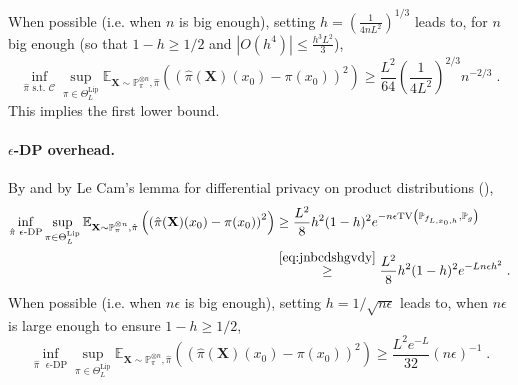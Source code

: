 \documentclass[10pt]{article} %
\newcommand{\Prob}[0]{\mathbb{P}}
\newcommand{\E}[0]{\mathbb{E}}
\newcommand\vect[1]{\mathbf{#1}}
\newcommand\tv[2]{\mathrm{TV}\left( {#1}, {#2} \right)}
\newcommand\p[1]{\left( {#1}\right)}
\begin{document}
When possible (i.e. when $n$ is big enough), setting $h = \p{\frac{1}{4nL^2}}^{1/3}$ leads to, for $n$ big enough (so that $1-h \geq 1/2$ %
and $|O(h^4)| \leq \frac{h^3L^2}{3}$),
\begin{equation*}
    \inf_{\hat{\pi} \text{ s.t. } \mathcal{C}} \sup_{\pi \in \Theta^{\text{Lip}}_L}
    \E_{\vect{X} \sim \Prob_{\pi}^{\otimes n}, \hat{\pi}}\p{\p{\hat{\pi}(\vect{X})(x_0) - \pi(x_0)}^2} \geq \frac{L^2}{64} \p{\frac{1}{4L^2}}^{2/3} n^{-2/3}
    \;.
\end{equation*}
This implies the first lower bound. 

\paragraph{$\epsilon$-DP overhead.}
By  and by Le Cam's lemma for differential privacy on product distributions (),
\begin{equation*}
    \begin{aligned}
    \inf_{\hat{\pi} \text{ $\epsilon$-DP}} \sup_{\pi \in \Theta^{\text{Lip}}_L}
    \E_{\vect{X} \sim \Prob_{\pi}^{\otimes n}, \hat{\pi}}\p{\p{\hat{\pi}(\vect{X})(x_0) - \pi(x_0)}^2} 
    &\geq 
    \frac{L^2}{8}h^2 (1-h)^2
    e^{-n\epsilon \tv{\Prob_{f_{L, x_0, h}}}{\Prob_{g}} } \\
    &\stackrel{\eqref{eq:jnbcdshgvdy}}{\geq} 
    \frac{L^2}{8} h^2 (1-h)^2 %
    e^{-L n \epsilon h^2}\;.
    \end{aligned}
\end{equation*}
When possible (i.e. when $n \epsilon$ is big enough), setting $h = 1/\sqrt{n\epsilon}$ leads to, when $n \epsilon$ is large enough to ensure $1-h \geq 1/2$,  %
\begin{equation*}
    \inf_{\hat{\pi} \text{ $\epsilon$-DP}} \sup_{\pi \in \Theta^{\text{Lip}}_L}
    \E_{\vect{X} \sim \Prob_{\pi}^{\otimes n}, \hat{\pi}}\p{\p{\hat{\pi}(\vect{X})(x_0) - \pi(x_0)}^2} \geq \frac{L^2 e^{-L}}{32} (n \epsilon)^{-1}
    \;.
\end{equation*}
\end{document}
